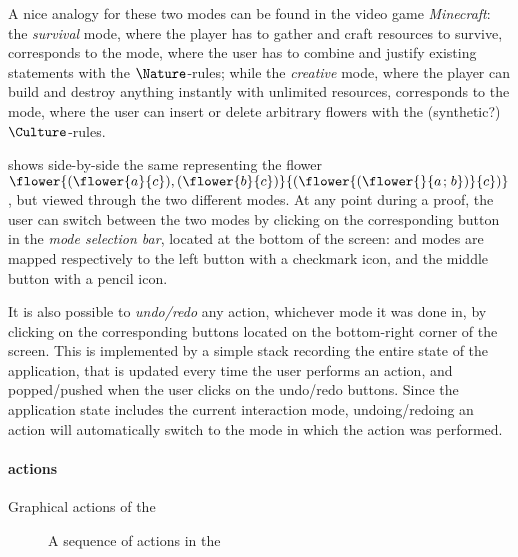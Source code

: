 \begin{remark}
  A nice analogy for these two modes can be found in the video game
  \emph{Minecraft}: the \emph{survival} mode, where the player has to gather and
  craft resources to survive, corresponds to the \Proof mode, where the user has
  to combine and justify existing statements with the  $\Nature$-rules;
  while the \emph{creative} mode, where the player can build and destroy
  anything instantly with unlimited resources, corresponds to the \Edit mode,
  where the user can insert or delete arbitrary flowers with the (synthetic?)
  $\Culture$-rules.
\end{remark}

 shows side-by-side the same  representing the
flower $\flower{(\flower{a}{c}),(\flower{b}{c})}{(\flower{(\flower{}{a \sep
b})}{c})}$, but viewed through the two different modes. At any point during a
proof, the user can switch between the two modes by clicking on the
corresponding button in the \emph{mode selection bar}, located at the bottom of
the screen: \Proof and \Edit modes are mapped respectively to the left button with
a checkmark icon, and the middle button with a pencil icon.

It is also possible to \emph{undo/redo} any action, whichever mode it was done
in, by clicking on the corresponding buttons located on the bottom-right corner
of the screen. This is implemented by a simple stack recording the entire state
of the application, that is updated every time the user performs an action, and
popped/pushed when the user clicks on the undo/redo buttons. Since the
application state includes the current interaction mode, undoing/redoing an
action will automatically switch to the mode in which the action was performed.

\paragraph{\Proof actions}

\begin{table*}[h]
  
  \caption{Graphical actions of the }
\end{table*}

\begin{figure*}[h]
  
  \caption{A sequence of \Proof actions in the }
\end{figure*}

